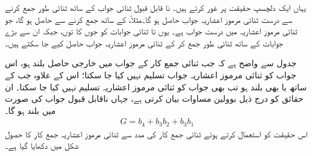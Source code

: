 یہاں ایک دلچسپ حقیقت پر غور کرتے ہیں۔ نا قابل قبول ثنائی جواب کے ساتھ  ثنائی طور جمع کرنے سے درست ثنائی مرموز اعشاریہ جواب حاصل ہو گا۔مثلاً، کے ساتھ  جمع کرنے سے  حاصل ہو گا، جو ثنائی مرموز اعشاریہ میں درست جواب ہے۔ یوں  تا  ثنائی جوابات کو جوں کا توں، جبکہ ان سے بڑے جوابات کے ساتھ  ثنائی طور جمع کر کے ثنائی مرموز اعشاریہ جواب حاصل کیے جا سکتے ہیں۔

	
جدول سے واضح ہے کہ جب ثنائی جمع کار کے جواب میں خارجی حاصل  بلند ہو، اس جواب کو ثنائی مرموز اعشاریہ جواب تسلیم نہیں کیا جا سکتا؛ اس کے علاوہ جب  کے ساتھ  یا  بھی بلند ہو تب بھی جواب کو ثنائی مرموز اعشاریہ تسلیم نہیں کیا جا سکتا۔ ان حقائق کو درج ذیل بوولین مساوات بیان کرتی ہے، جہاں ناقابل قبول جواب کی صورت میں  بلند ہو گا۔
 \begin{align}
 G=b_4+b_3b_2+b_3b_1
 \end{align}
اس حقیقت کو استعمال کرتے ہوئے ثنائی جمع کار کی مدد سے ثنائی مرموز اعشاریہ جمع کار کا حصول شکل  میں دکھایا گیا ہے۔
